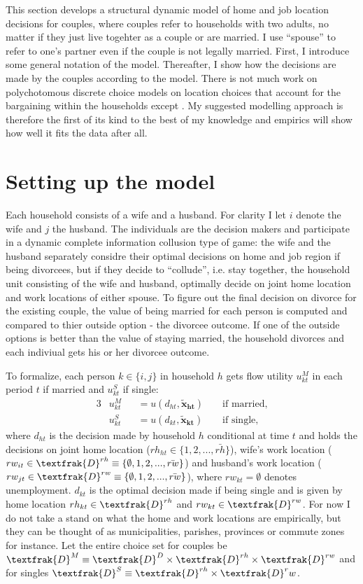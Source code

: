 This section develops a structural dynamic model of home and job location decisions for couples, where couples refer to households with two adults, no matter if they just live togehter as a couple or are married. I use ``spouse'' to refer to one's partner even if the couple is not legally married. First, I introduce some general notation of the model. Thereafter, I show how the decisions are made by the couples according to the model. There is not much work on polychotomous discrete choice models on location choices that account for the bargaining within the households except \cite{Gemici2011}. My suggested modelling approach is therefore the first of its kind to the best of my knowledge and empirics will show how well it fits the data after all.

\section{Setting up the model}\label{sec:setupmodel}
Each household consists of a wife and a husband. For clarity I let $i$ denote the wife and $j$ the husband. The individuals are the decision makers and participate in a dynamic complete information collusion type of game: the wife and the husband separately considre their optimal decisions on home and job region if being divorcees, but if they decide to ``collude'', i.e. stay together, the household unit consisting of the wife and husband, optimally decide on joint home location and work locations of either spouse. To figure out the final decision on divorce for the existing couple, the value of being married for each person is computed and compared to thier outside option - the divorcee outcome. If one of the outside options is better than the value of staying married, the household divorces and each indiviual gets his or her divorcee outcome. 

To formalize, each person $k\in\{i,j\}$ in household $h$ gets flow utility $u_{kt}^M$ in each period $t$ if married and $u_{kt}^S$ if single:
\begin{alignat*}{3}
&u_{kt}^M &&= u(d_{ht},\boldsymbol{\tilde{x}_{ht}}) &&\text{ if married}, \\
&u_{kt}^S &&= u(d_{kt},\boldsymbol{\tilde{x}_{kt}}) &&\text{ if single},
\end{alignat*}
where $d_{ht}$ is the decision made by household $h$ conditional at time $t$ and holds the decisions on joint home location ($rh_{ht}\in \{1,2,...,\bar{rh}\}$), wife's work location ($rw_{it}\in \textfrak{D}^{rh}\equiv \{\emptyset,1,2,...,\bar{rw}\}$) and husband's work location ($rw_{jt}\in \textfrak{D}^{rw}\equiv \{\emptyset,1,2,...,\bar{rw}\}$), where $rw_{kt}=\emptyset$ denotes unemployment. $d_{kt}$ is the optimal decision made if being single and is given by home location $rh_{kt}\in\textfrak{D}^{rh}$ and $rw_{kt}\in\textfrak{D}^{rw}$. For now I do not take a stand on what the home and work locations are empirically, but they can be thought of as municipalities, parishes, provinces or commute zones for instance. Let the entire choice set for couples be $\textfrak{D}^M\equiv \textfrak{D}^D\times\textfrak{D}^{rh}\times\textfrak{D}^{rw}$ and for singles $\textfrak{D}^S\equiv\textfrak{D}^{rh}\times\textfrak{D}^rw$.


